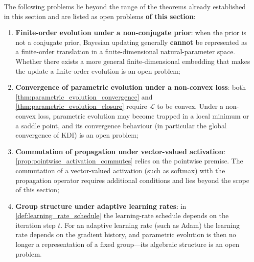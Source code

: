\begin{remark}\label{rem:information_evolution_open}
The following problems lie beyond the range of the theorems already established in this section and are listed as open problems \textbf{of this section}:
\begin{enumerate}[label=(\roman*)]
    \item \textbf{Finite-order evolution under a non-conjugate prior}: when the prior is not a conjugate prior, Bayesian updating generally \textbf{cannot} be represented as a finite-order translation in a finite-dimensional natural-parameter space. Whether there exists a more general finite-dimensional embedding that makes the update a finite-order evolution is an open problem;
    \item \textbf{Convergence of parametric evolution under a non-convex loss}: both \cref{thm:parametric_evolution_convergence} and \cref{thm:parametric_evolution_closure} require $\mathcal{L}$ to be convex. Under a non-convex loss, parametric evolution may become trapped in a local minimum or a saddle point, and its convergence behaviour (in particular the global convergence of KDI) is an open problem;
    \item \textbf{Commutation of propagation under vector-valued activation}: \cref{prop:pointwise_activation_commutes} relies on the pointwise premise. The commutation of a vector-valued activation (such as softmax) with the propagation operator requires additional conditions and lies beyond the scope of this section;
    \item \textbf{Group structure under adaptive learning rates}: in \cref{def:learning_rate_schedule} the learning-rate schedule depends on the iteration step $t$. For an adaptive learning rate (such as Adam) the learning rate depends on the gradient history, and parametric evolution is then no longer a representation of a fixed group---its algebraic structure is an open problem.
\end{enumerate}
\end{remark}

